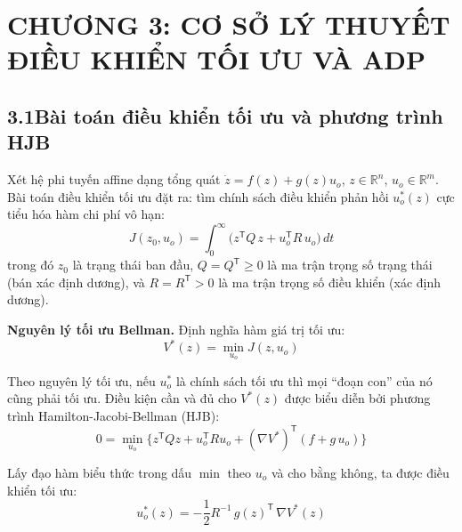 \documentclass[12pt,a4paper]{article}
\newcommand{\chapternum}{0}
\newcommand{\setchapter}[1]{%
  \renewcommand{\chapternum}{#1}%
  \setcounter{figure}{0}%
  \setcounter{table}{0}%
  \setcounter{equation}{0}%
  \renewcommand{\thefigure}{\chapternum.\arabic{figure}}%
  \renewcommand{\thetable}{\chapternum.\arabic{table}}%
  \renewcommand{\theequation}{\chapternum.\arabic{equation}}%
  \renewcommand{\theHfigure}{\chapternum.\arabic{figure}}%
  \renewcommand{\theHtable}{\chapternum.\arabic{table}}%
  \renewcommand{\theHequation}{\chapternum.\arabic{equation}}%
  \setcounter{dinhly}{0}\setcounter{bode}{0}\setcounter{hequa}{0}%
  \def\theHdinhly{\chapternum.\arabic{dinhly}}%
  \def\theHbode{\chapternum.\arabic{bode}}%
  \def\theHhequa{\chapternum.\arabic{hequa}}%
}
\newcommand{\R}{\mathbb{R}}
\newcommand{\T}{\mathsf{T}}
\begin{document}
\newpage
\setchapter{3}
\section*{CHƯƠNG 3: CƠ SỞ LÝ THUYẾT ĐIỀU KHIỂN TỐI ƯU VÀ ADP}

\subsection*{3.1\quad Bài toán điều khiển tối ưu và phương trình HJB}

Xét hệ phi tuyến affine dạng tổng quát $\dot{z} = f(z) + g(z) u_o$, $z \in \R^n$, $u_o \in \R^m$. Bài toán điều khiển tối ưu đặt ra: tìm chính sách điều khiển phản hồi $u_o^*(z)$ cực tiểu hóa hàm chi phí vô hạn:
\begin{equation}\label{eq:cost}
    J(z_0, u_o) = \int_0^\infty \big( z^\T Q\, z + u_o^\T R\, u_o \big)\, dt
\end{equation}
trong đó $z_0$ là trạng thái ban đầu, $Q = Q^\T \geq 0$ là ma trận trọng số trạng thái (bán xác định dương), và $R = R^\T > 0$ là ma trận trọng số điều khiển (xác định dương).

\textbf{Nguyên lý tối ưu Bellman.} Định nghĩa hàm giá trị tối ưu:
\begin{equation}\label{eq:value_function}
    V^*(z) = \min_{u_o} J(z, u_o)
\end{equation}

Theo nguyên lý tối ưu, nếu $u_o^*$ là chính sách tối ưu thì mọi ``đoạn con'' của nó cũng phải tối ưu. Điều kiện cần và đủ cho $V^*(z)$ được biểu diễn bởi phương trình Hamilton-Jacobi-Bellman (HJB):
\begin{equation}\label{eq:hjb}
    0 = \min_{u_o} \Big\{ z^\T Q z + u_o^\T R u_o + (\nabla V^*)^\T (f + g\, u_o) \Big\}
\end{equation}

Lấy đạo hàm biểu thức trong dấu $\min$ theo $u_o$ và cho bằng không, ta được điều khiển tối ưu:
\begin{equation}\label{eq:optimal_u}
    u_o^*(z) = -\frac{1}{2} R^{-1}\, g(z)^\T\, \nabla V^*(z)
\end{equation}
\end{document}
